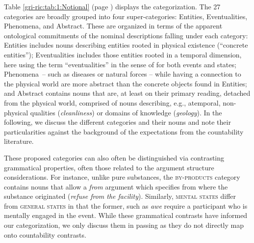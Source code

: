 \documentclass[output=paper]{langscibook}
\begin{document}
Table \ref{gri-ric:tab:1:Notional} (page \pageref{gri-ric:tab:1:Notional}) displays the categorization.  The 27 categories are broadly grouped into four super-categories: Entities, Eventualities, Phenomena, and Abstract.  These are organized in terms of the apparent ontological commitments of the nominal descriptions falling under each category: Entities includes nouns describing entities rooted in physical existence (``concrete entities''); Eventualities includes those entities rooted in a temporal dimension, here using the term ``eventualities'' in the sense of \citet{Bach1986} for both events and states; Phenomena~-- such as diseases or natural forces -- while having a connection to the physical world are more abstract than the concrete objects found in Entities; and Abstract contains nouns that are, at least on their primary reading, detached from the physical world, comprised of nouns describing, e.g., atemporal, non-physical qualities (\textit{cleanliness}) or domains of knowledge (\textit{geology}).     In the following, we discuss the different categories and their nouns and note their particularities against the background of the expectations from the countability literature.%

\begin{sloppypar}
These proposed categories can also often be distinguished via contrasting grammatical properties, often those related to the argument structure considerations.  For instance, unlike pure substances, the \textsc{by-products} category contains nouns that allow a \textit{from} argument which specifies from where the substance originated (\textit{refuse from the facility}).  Similarly, \textsc{mental states} differ from \textsc{general states} in that the former, such as \textit{awe} require a participant who is mentally engaged in the event.  While these grammatical contrasts have informed our categorization, we only discuss them in passing as they do not directly map onto countability contrasts.
\end{sloppypar}
\end{document}
